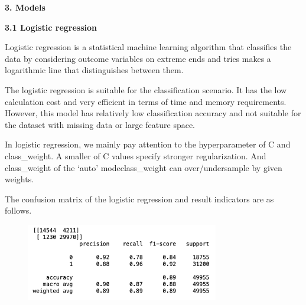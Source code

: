 \documentclass[12pt]{article}
\begin{document}
\vspace{\baselineskip}
{\fontsize{14pt}{16.8pt}\selectfont \textbf{3. Models}\par}\par

\textbf{3.1 Logistic regression}\par

\begin{justify}
Logistic regression is a statistical machine learning algorithm that classifies the data by considering outcome variables on extreme ends and tries makes a logarithmic line that distinguishes between them.
\end{justify}\par

\begin{justify}
The logistic regression is suitable for the classification scenario. It has the low calculation cost and very efficient in terms of time and memory requirements. However, this model has relatively low classification accuracy and not suitable for the dataset with missing data or large feature space. 
\end{justify}\par

\begin{justify}
In logistic regression, we mainly pay attention to the hyperparameter of C and class\_weight. A smaller of C values specify stronger regularization. And class\_weight of the ‘auto’ modeclass\_weight can over/undersample by given weights. 
\end{justify}\par

\begin{justify}
The confusion matrix of the logistic regression and result indicators are as follows.
\end{justify}\par




\begin{figure}[H]
	\begin{Center}
		\includegraphics[width=3.3in,height=1.34in]{./media/image10.png}
	\end{Center}
\end{figure}
\end{document}
